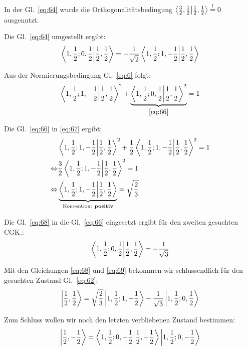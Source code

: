 In der Gl.~\eqref{eq:64} wurde die Orthogonalitätsbedingung \(\braket{\frac 3
2,\frac 1 2}{\frac 1 2, \frac 1 2} \stackrel{!}=0\) ausgenutzt.

Die Gl.~\eqref{eq:64} umgestellt ergibt:
\begin{equation}
  \label{eq:66}
  \braket{1,\frac 1 2;0,\frac 1 2}{\frac 1 2,\frac 1 2}
  = -\frac 1 {\sqrt 2}\braket{1,\frac 1 2;1,-\frac 1 2}{\frac 1 2,\frac 1 2}
\end{equation}

Aus der Normierungsbedingung Gl.~\eqref{eq:6} folgt:
\begin{equation}
  \label{eq:67}
  \braket{1,\frac 1 2;1,-\frac 1 2}{\frac 1 2,\frac 1 2}^2+
  \underbrace{\braket{1,\frac 1 2;0,\frac 1 2}{\frac 1 2,\frac 1 2}^2}
  _{\eqref{eq:66}} =1
\end{equation}

Die Gl.~\eqref{eq:66} in \eqref{eq:67} ergibt:
\begin{align}
  \label{eq:68}
   &\braket{1,\frac 1 2;1,-\frac 1 2}{\frac 1 2,\frac 1 2}^2
   +\frac 1 2 \braket{1,\frac 1 2;1,-\frac 1 2}{\frac 1 2,\frac 1 2}^2=1
   \notag\\
   \Leftrightarrow 
   &\frac 3 2 \braket{1,\frac 1 2;1,-\frac 1 2}{\frac 1 2,\frac 1 2}^2=1
   \notag\\
   \Leftrightarrow&\underbrace{ 
    \braket{1,\frac 1 2;1,-\frac 1 2}{\frac 1 2,\frac 1 2}}
  _{\text{Konvention: \textbf{positiv}}}=\sqrt{\frac 2 3}
\end{align}

Die Gl.~\eqref{eq:68} in die Gl.~\eqref{eq:66} eingesetzt ergibt für den zweiten
gesuchten CGK.:
\begin{equation}
  \label{eq:69}
  \braket{1,\frac 1 2;0,\frac 1 2}{\frac 1 2,\frac 1 2}=-\frac 1 {\sqrt 3}
\end{equation}

Mit den Gleichungen \eqref{eq:68} und \eqref{eq:69} bekommen wir schlussendlich
für den gesuchten Zustand Gl.~\eqref{eq:62}:
\begin{equation}
  \label{eq:70}
    \left| \frac 1 2, \frac 1 2 \right\rangle=\sqrt{\frac 2 3}\left| 1,\frac 1 2;1,-\frac 1 2 \right\rangle
   -\frac 1 {\sqrt 3}\left| 1,\frac 1 2;0,\frac 1 2 \right\rangle
\end{equation}

Zum Schluss wollen wir noch den letzten verbliebenen Zustand bestimmen:
\begin{equation}
  \label{eq:71}
  \ket{\frac 1 2,-\frac 1 2}=\braket{1,\frac 1 2;0,-\frac 1 2}
  {\frac 1 2,-\frac 1 2 }\ket{1,\frac 1 2;0,-\frac 1 2}
\end{equation}


